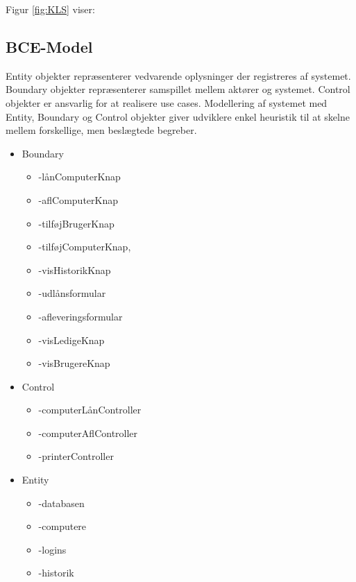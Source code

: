 \documentclass[a4paper]{article}
\begin{document}
Figur \ref{fig:KLS} viser:
\newpage
\subsection{BCE-Model}
Entity objekter repræsenterer vedvarende oplysninger der registreres af systemet. Boundary objekter repræsenterer samspillet mellem aktører og systemet. Control objekter er ansvarlig for at realisere use cases. Modellering af systemet med Entity, Boundary og Control objekter giver udviklere enkel heuristik til at skelne mellem forskellige, men beslægtede begreber.\cite[p~171]{OOSE}
\begin{itemize}
\item Boundary
\begin{itemize}
\item{-}lånComputerKnap 
\item{-}aflComputerKnap 
\item{-}tilføjBrugerKnap 
\item{-}tilføjComputerKnap, 
\item{-}visHistorikKnap 
\item{-}udlånsformular 
\item{-}afleveringsformular 
\item{-}visLedigeKnap 
\item{-}visBrugereKnap
\end{itemize}
\item Control
\begin{itemize} 
\item{-}computerLånController 
\item{-}computerAflController 
\item{-}printerController
\end{itemize}
\item Entity
\begin {itemize} 
\item{-}databasen 
\item{-}computere 
\item{-}logins 
\item{-}historik
\end{itemize}
\end{itemize}
\newpage
\end{document}
